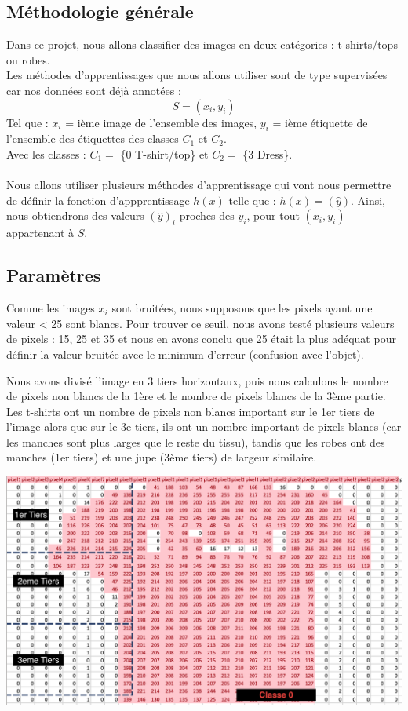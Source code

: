 \documentclass[a4paper,10pt]{article}
\begin{document}
	\subsection{Méthodologie générale}
		Dans ce projet, nous allons classifier des images en deux catégories : t-shirts/tops ou robes.\\
		Les méthodes d'apprentissages que nous allons utiliser sont de type supervisées car nos données sont déjà annotées :
		$$ S = {(x_i, y_i)} $$
		Tel que : $x_i$ = ième image de l'ensemble des images, $y_i$ = ième étiquette de l'ensemble des étiquettes des classes $C_1$ et $C_2$.\\
		Avec les classes : $C_1 =$ \{0 T-shirt/top\} et $C_2 =$ \{3 Dress\}.\\
		\\
		Nous allons utiliser plusieurs méthodes d’apprentissage qui vont nous permettre de définir la fonction d'appprentissage $h(x)$ telle que : $h(x) = (\hat y)$. Ainsi, nous obtiendrons des valeurs $(\hat y)_i$ proches des $y_i$, pour tout $(x_i, y_i)$ appartenant à $S$.\\

	\subsection{Paramètres}
		Comme les images $x_i$ sont bruitées, nous supposons que les pixels ayant une valeur < 25 sont blancs.
		Pour trouver ce seuil, nous avons testé plusieurs valeurs de pixels : 15, 25 et 35 et nous en avons conclu que 25 était la plus adéquat pour définir la valeur bruitée avec le minimum d'erreur (confusion avec l'objet).\\
		\begin{minipage}{0.55\linewidth}
			Nous avons divisé l’image en 3 tiers horizontaux, puis nous calculons le nombre de pixels non blancs de la 1ère et le nombre de pixels blancs de la 3ème partie. Les t-shirts ont un nombre de pixels non blancs important sur le 1er tiers de l'image alors que sur le 3e tiers, ils ont un nombre important de pixels blancs (car les manches sont plus larges que le reste du tissu), tandis que les robes ont des manches (1er tiers) et une jupe (3ème tiers) de largeur similaire. 
		\end{minipage}\hfill
		\begin{minipage}{0.4\linewidth}
			\includegraphics[scale = 0.15]{fichiers/decoupe_tshirt.png}		
		\end{minipage}\hfill
\end{document}

